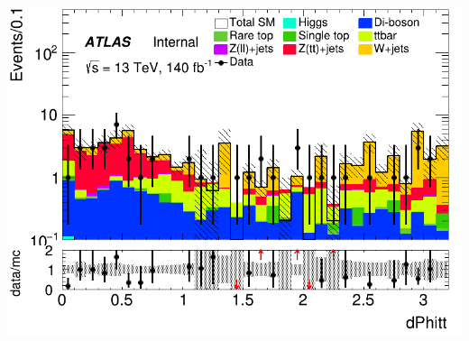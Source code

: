 \documentclass[usenames,dvipsnames]{beamer}
\begin{document}
\begin{frame}
\begin{minipage}{0.32\textwidth}
        \includegraphics[width=\textwidth]{graphics/HHH_met/HHH_met_dPhitt.png}
    \end{minipage}
\end{frame}
\end{document}
